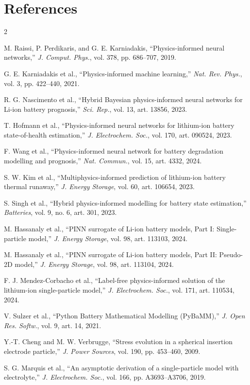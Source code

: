 \documentclass[14pt,a4paper,oneside]{extreport}
\begin{document}
\clearpage
\chapter*{References}
\label{references}
\begingroup
\fontsize{10.5}{11.8}\selectfont
{}
\begin{multicols}{2}
\begin{enumerate}[label={\textnormal{[\arabic*]}},leftmargin=*,itemsep=0.25em,topsep=0pt]
\item M. Raissi, P. Perdikaris, and G. E. Karniadakis, ``Physics-informed neural networks,'' \emph{J. Comput. Phys.}, vol. 378, pp. 686--707, 2019.
\item G. E. Karniadakis et al., ``Physics-informed machine learning,'' \emph{Nat. Rev. Phys.}, vol. 3, pp. 422--440, 2021.
\item R. G. Nascimento et al., ``Hybrid Bayesian physics-informed neural networks for Li-ion battery prognosis,'' \emph{Sci. Rep.}, vol. 13, art. 13856, 2023.
\item T. Hofmann et al., ``Physics-informed neural networks for lithium-ion battery state-of-health estimation,'' \emph{J. Electrochem. Soc.}, vol. 170, art. 090524, 2023.
\item F. Wang et al., ``Physics-informed neural network for battery degradation modelling and prognosis,'' \emph{Nat. Commun.}, vol. 15, art. 4332, 2024.
\item S. W. Kim et al., ``Multiphysics-informed prediction of lithium-ion battery thermal runaway,'' \emph{J. Energy Storage}, vol. 60, art. 106654, 2023.
\item S. Singh et al., ``Hybrid physics-informed modelling for battery state estimation,'' \emph{Batteries}, vol. 9, no. 6, art. 301, 2023.
\item M. Hassanaly et al., ``PINN surrogate of Li-ion battery models, Part I: Single-particle model,'' \emph{J. Energy Storage}, vol. 98, art. 113103, 2024.
\item M. Hassanaly et al., ``PINN surrogate of Li-ion battery models, Part II: Pseudo-2D model,'' \emph{J. Energy Storage}, vol. 98, art. 113104, 2024.
\item F. J. Mendez-Corbacho et al., ``Label-free physics-informed solution of the lithium-ion single-particle model,'' \emph{J. Electrochem. Soc.}, vol. 171, art. 110534, 2024.
\item V. Sulzer et al., ``Python Battery Mathematical Modelling (PyBaMM),'' \emph{J. Open Res. Softw.}, vol. 9, art. 14, 2021.
\item Y.-T. Cheng and M. W. Verbrugge, ``Stress evolution in a spherical insertion electrode particle,'' \emph{J. Power Sources}, vol. 190, pp. 453--460, 2009.
\item S. G. Marquis et al., ``An asymptotic derivation of a single-particle model with electrolyte,'' \emph{J. Electrochem. Soc.}, vol. 166, pp. A3693--A3706, 2019.
\end{enumerate}
\end{multicols}
\endgroup
\end{document}
